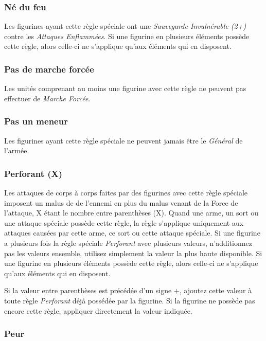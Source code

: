 \subsubsection*{Né du feu}

Les figurines ayant cette règle spéciale ont une \emph{Sauvegarde Invulnérable (2+)} contre les \emph{Attaques Enflammées}. Si une figurine en plusieurs éléments possède cette règle, alors celle-ci ne s'applique qu'aux éléments qui en disposent.

\subsubsection*{Pas de marche forcée}

Les unités comprenant au moins une figurine avec cette règle ne peuvent pas effectuer de \emph{Marche Forcée}.


\subsubsection*{Pas un meneur}

Les figurines ayant cette règle spéciale ne peuvent jamais être le \emph{Général} de l'armée.

\subsubsection*{Perforant (X)}

Les attaques de corps à corps faites par des figurines avec cette règle spéciale imposent un malus de  de l'ennemi en plus du malus venant de la Force de l'attaque, X étant le nombre entre parenthèses (X). Quand une arme, un sort ou une attaque spéciale possède cette règle, la règle s'applique uniquement aux attaques causées par cette arme, ce sort ou cette attaque spéciale. Si une figurine a plusieurs fois la règle spéciale \emph{Perforant} avec plusieurs valeurs, n'additionnez pas les valeurs ensemble, utilisez simplement la valeur la plus haute disponible. Si une figurine en plusieurs éléments possède cette règle, alors celle-ci ne s'applique qu'aux éléments qui en disposent.

Si la valeur entre parenthèses est précédée d'un signe $+$, ajoutez cette valeur à toute règle \emph{Perforant} déjà possédée par la figurine. Si la figurine ne possède pas encore cette règle, appliquer directement la valeur indiquée.

\subsubsection*{Peur}

